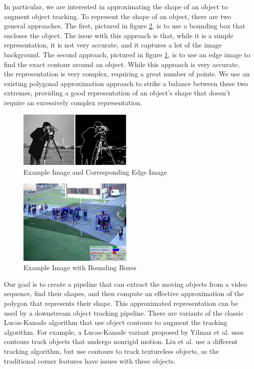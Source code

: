 \documentclass[10pt,twocolumn,letterpaper]{article}
\begin{document}
In particular, we are interested in approximating the shape of an object to augment object tracking. To represent the
shape of an object, there are two general approaches. The first, pictured in figure \ref{fig:bounding_box_example}, is
to use a  bounding box that encloses the object. The issue with this approach is that, while it is a simple
representation, it is not very accurate, and it captures a lot of the image background. The second approach, pictured in
figure \ref{fig:edge_image_example}, is to use an edge image to find the exact contour around an object. While this
approach is very accurate, the representation is very complex, requiring a great number of points. We use an existing
polygonal approximation approach to strike a balance between these two extremes, providing a good representation of an
object's shape that doesn't require an excessively complex representation.

\begin{figure}
    \centering
    \includegraphics[width=0.495\textwidth]{images/edge_image_example}
    \caption{Example Image and Corresponding Edge Image}
    \label{fig:edge_image_example}
\end{figure}

\begin{figure}
	\centering
    \includegraphics[width=0.495\textwidth]{images/bounding_box_example}
	\caption{Example Image with Bounding Boxes}
	\label{fig:bounding_box_example}
\end{figure}

Our goal is to create a pipeline that can extract the moving objects from a video sequence, find their shapes, and then
compute an effective approximation of the polygon that represents their shape. This approximated representation can be
used by a downstream object tracking pipeline. There are variants of the classic Lucas-Kanade algorithm that use object
contours to augment the tracking algorithm. For example, a  Lucas-Kanade variant proposed by Yilmaz et al.
\cite{Yilmaz2004} uses contours track objects that undergo nonrigid motion. Liu et al. \cite{Liu2006} use a different
tracking algorithm, but use contours to track textureless objects, as the traditional corner features have issues with
these objects.
\end{document}
